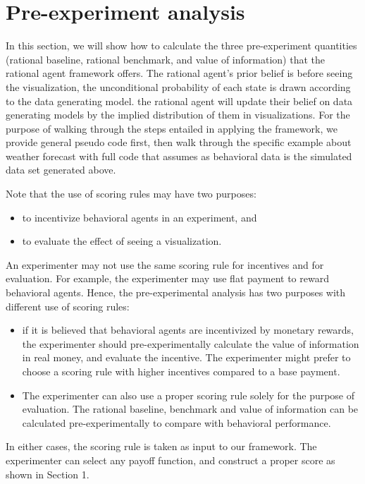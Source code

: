 \documentclass{article}
\begin{document}
\section{Pre-experiment analysis}

In this section, we will show how to calculate the three pre-experiment quantities (rational baseline, rational benchmark, and value of information) that the rational agent framework offers. The rational agent's prior belief is before seeing the visualization, the unconditional probability of each state is drawn according to the data generating model. the rational agent will update their belief on data generating models by the implied distribution of them in visualizations. For the purpose of walking through the steps entailed in applying the framework, we provide general pseudo code first, then walk through the specific example about weather forecast with full code that assumes as behavioral data is the simulated data set generated above.

Note that the use of scoring rules may have two purposes:
\begin{itemize}
\item to incentivize behavioral agents in an experiment, and
\item to evaluate the effect of seeing a visualization.
\end{itemize}

An experimenter may not use the same scoring rule for incentives and for evaluation. For example, the experimenter may use flat payment to reward behavioral agents. Hence, the pre-experimental analysis has two purposes with different use of scoring rules:
\begin{itemize}
\item if it is  believed that behavioral agents are incentivized by monetary rewards, the experimenter should pre-experimentally calculate the value of information in real money, and evaluate the incentive. The experimenter might prefer to choose a scoring rule with higher incentives compared to a base payment.
\item The experimenter can also use a proper scoring rule solely for the purpose of evaluation. The rational baseline, benchmark and value of information can be calculated pre-experimentally to compare with behavioral performance. 
\end{itemize}

In either cases, the scoring rule is taken as input to our framework. The experimenter can select any payoff function, and construct a proper score as shown in Section 1. 
\end{document}

